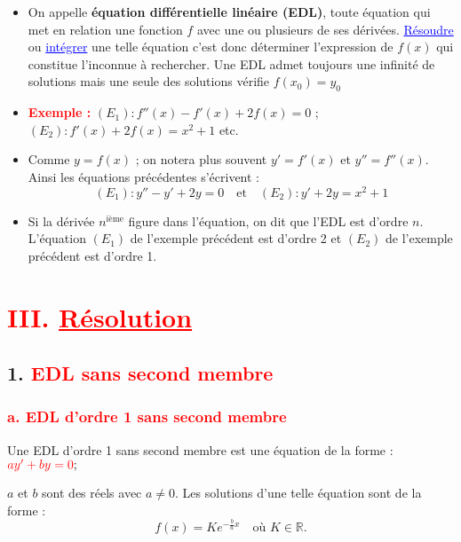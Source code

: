 \documentclass[12pt]{article}
\begin{document}
\begin{itemize}
    \item On appelle \textbf{équation différentielle linéaire (EDL)}, toute équation qui met en relation une fonction $f$ avec une ou plusieurs de ses dérivées. \textcolor{blue}{\underline{Résoudre}} ou \textcolor{blue}{\underline{intégrer}} une telle équation c’est donc déterminer l’expression de $f(x)$ qui constitue l’inconnue à rechercher. Une EDL admet toujours une infinité de solutions mais une seule des solutions vérifie $f(x_0)=y_0$
    
    \item \textbf{\textcolor{red}{Exemple :}} $(E_1) : f''(x) - f'(x) + 2f(x) = 0$ ; $(E_2) : f'(x) + 2f(x) = x^2 + 1$ etc.
    
    \item Comme $y = f(x)$ ; on notera plus souvent $y' = f'(x)$ et $y'' = f''(x)$.\\
    Ainsi les équations précédentes s’écrivent : 
    \[
        (E_1) : y'' - y' + 2y = 0 \quad \text{et} \quad (E_2) : y' + 2y = x^2 + 1
    \]
    
    \item Si la dérivée $n^{\text{ième}}$ figure dans l’équation, on dit que l’EDL est d’ordre $n$.\\
    L’équation $(E_1)$ de l’exemple précédent est d’ordre 2 et $(E_2)$ de l’exemple précédent est d’ordre 1.
\end{itemize}

\section*{\textcolor{red}{III. \underline{Résolution}}}
\subsection*{1. \textcolor{red}{EDL sans second membre}}

\subsubsection*{\textcolor{red}{a. EDL d’ordre 1 sans second membre}}
Une EDL d’ordre 1 sans second membre est une équation de la forme : \(\textcolor{red}{ay' + by = 0} ;\)

$a$ et $b$ sont des réels avec $a \neq 0$. Les solutions d’une telle équation sont de la forme : 
\[
\boxed{f(x) = Ke^{-\frac{b}{a}x}} \quad \text{où } K \in \mathbb{R}.
\]
\end{document}
